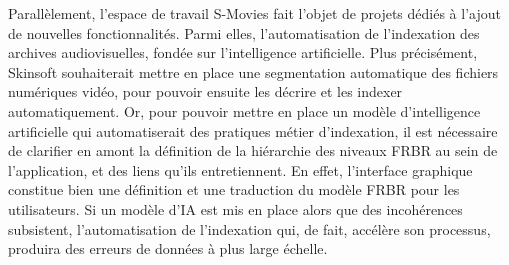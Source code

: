 Parallèlement, l'espace de travail S-Movies fait l'objet de projets dédiés à l'ajout de nouvelles fonctionnalités. Parmi elles, l'automatisation de l'indexation des archives audiovisuelles, fondée sur l'intelligence artificielle. Plus précisément, Skinsoft souhaiterait mettre en place une segmentation automatique des fichiers numériques vidéo, pour pouvoir ensuite les décrire et les indexer automatiquement. Or, pour pouvoir mettre en place un modèle d'intelligence artificielle qui automatiserait des pratiques métier d'indexation, il est nécessaire de clarifier en amont la définition de la hiérarchie des niveaux FRBR au sein de l'application, et des liens qu'ils entretiennent. En effet, l'interface graphique constitue bien une définition et une traduction du modèle FRBR pour les utilisateurs. Si un modèle d'IA est mis en place alors que des incohérences subsistent, l'automatisation de l'indexation qui, de fait, accélère son processus, produira des erreurs de données à plus large échelle. 